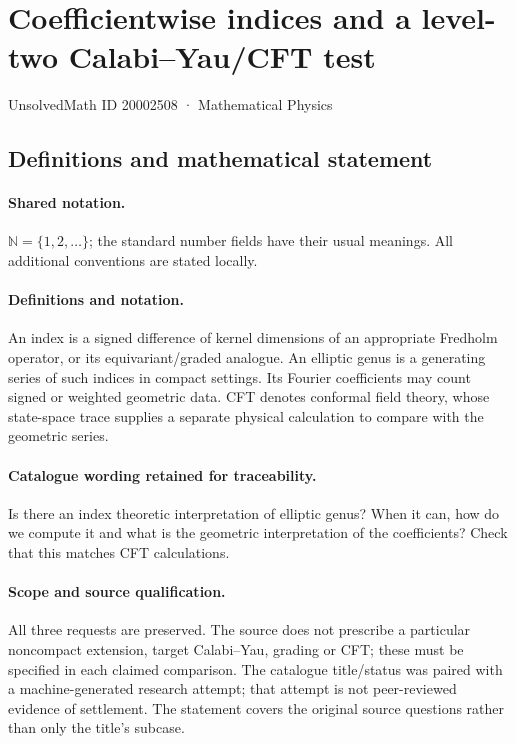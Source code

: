\documentclass[11pt]{article}
\begin{document}
\setcounter{section}{20002507}
\section{Coefficientwise indices and a level-two Calabi--Yau/CFT test}\label{20002508}
{\small UnsolvedMath ID 20002508 · Mathematical Physics}
\subsection{Definitions and mathematical statement}

\paragraph{Shared notation.}$\mathbb N=\{1,2,\ldots\}$; the standard number fields have their usual meanings. All additional conventions are stated locally.


\paragraph{Definitions and notation.}An index is a signed difference of kernel dimensions of an appropriate Fredholm operator, or its equivariant/graded analogue. An elliptic genus is a generating series of such indices in compact settings. Its Fourier coefficients may count signed or weighted geometric data. CFT denotes conformal field theory, whose state-space trace supplies a separate physical calculation to compare with the geometric series.

\paragraph{Catalogue wording retained for traceability.}
Is there an index theoretic interpretation of elliptic genus? When it can, how do we compute it and what is the geometric interpretation of the coefficients? Check that this matches CFT calculations.
\paragraph{Scope and source qualification.}All three requests are preserved. The source does not prescribe a particular noncompact extension, target Calabi--Yau, grading or CFT; these must be specified in each claimed comparison. The catalogue title/status was paired with a machine-generated research attempt; that attempt is not peer-reviewed evidence of settlement. The statement covers the original source questions rather than only the title’s subcase.
\end{document}
